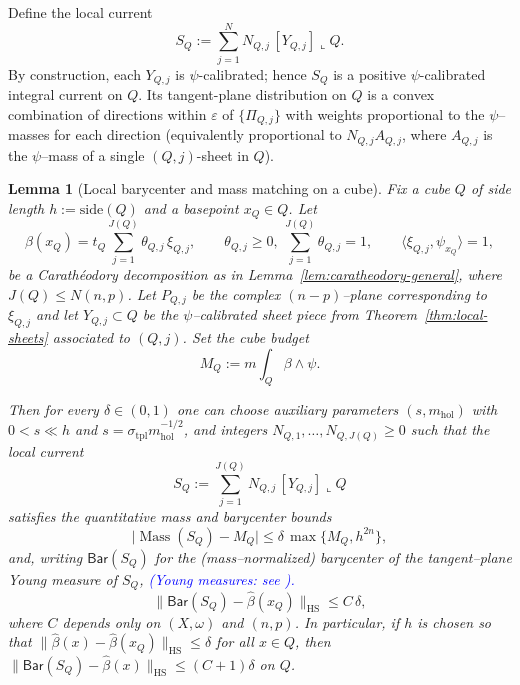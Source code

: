 \documentclass[11pt]{article}
\newcommand{\REV}[1]{\textcolor{blue}{#1}}
\numberwithin{equation}{section}  %
\theoremstyle{plain}
\newtheorem{lemma}[theorem]{Lemma}
\theoremstyle{definition}
\theoremstyle{remark}
\newcommand{\mhol}{m_{\mathrm{hol}}} %
\DeclareMathOperator{\Mass}{Mass}
\begin{document}
Define the local current
\[
S_Q := \sum_{j=1}^{N} N_{Q,j}\,[Y_{Q,j}]\llcorner Q.
\]
By construction, each $Y_{Q,j}$ is $\psi$-calibrated; hence $S_Q$ is a
positive $\psi$-calibrated integral current on $Q$.  Its tangent-plane
distribution on $Q$ is a convex combination of directions within
$\varepsilon$ of $\{\Pi_{Q,j}\}$ with weights proportional to the $\psi$--masses
for each direction (equivalently proportional to $N_{Q,j}A_{Q,j}$, where $A_{Q,j}$ is
the $\psi$--mass of a single $(Q,j)$-sheet in $Q$).

\begin{lemma}[Local barycenter and mass matching on a cube]\label{lem:local-bary}
Fix a cube $Q$ of side length $h:=\mathrm{side}(Q)$ and a basepoint $x_Q\in Q$.
Let
\[
\beta(x_Q)=t_Q\sum_{j=1}^{J(Q)}\theta_{Q,j}\,\xi_{Q,j},
\qquad
\theta_{Q,j}\ge 0,\ \sum_{j=1}^{J(Q)}\theta_{Q,j}=1,
\qquad
\langle \xi_{Q,j},\psi_{x_Q}\rangle=1,
\]
be a Carath\'eodory decomposition as in Lemma~\ref{lem:caratheodory-general}, where $J(Q)\le N(n,p)$.
Let $P_{Q,j}$ be the complex $(n-p)$--plane corresponding to $\xi_{Q,j}$ and let $Y_{Q,j}\subset Q$
be the $\psi$--calibrated sheet piece from Theorem~\ref{thm:local-sheets} associated to $(Q,j)$.
Set the cube budget
\[
M_Q:=m\int_Q \beta\wedge\psi.
\]

Then for every $\delta\in(0,1)$ one can choose auxiliary parameters $(s,\mhol)$ with $0<s\ll h$ and
$s=\sigma_{\mathrm{tpl}}\mhol^{-1/2}$, and integers $N_{Q,1},\ldots,N_{Q,J(Q)}\ge 0$ such that the local current
\[
S_Q := \sum_{j=1}^{J(Q)} N_{Q,j}\,[Y_{Q,j}]\llcorner Q
\]
satisfies the quantitative mass and barycenter bounds
\[
\bigl|\Mass(S_Q)-M_Q\bigr|\le \delta\,\max\{M_Q,h^{2n}\},
\]
and, writing $\mathsf{Bar}(S_Q)$ for the (mass--normalized) barycenter of the tangent--plane Young measure of $S_Q$, \REV{(Young measures: see \cite{KinderlehrerPedregal91,Pedregal97}).}
\[
\|\mathsf{Bar}(S_Q)-\widehat\beta(x_Q)\|_{\mathrm{HS}}
\le C\,\delta,
\]
where $C$ depends only on $(X,\omega)$ and $(n,p)$.
In particular, if $h$ is chosen so that $\|\widehat\beta(x)-\widehat\beta(x_Q)\|_{\mathrm{HS}}\le \delta$ for all $x\in Q$,
then $\|\mathsf{Bar}(S_Q)-\widehat\beta(x)\|_{\mathrm{HS}}\le (C+1)\delta$ on $Q$.
\end{lemma}
\end{document}
